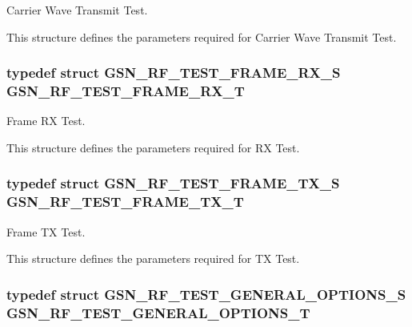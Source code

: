 Carrier Wave Transmit Test. 

This structure defines the parameters required for Carrier Wave Transmit Test. \hypertarget{a00677_gad57c6b5251e62dd07e194a52c90216ac}{
\subsubsection[{GSN\_\-RF\_\-TEST\_\-FRAME\_\-RX\_\-T}]{\setlength{\rightskip}{0pt plus 5cm}typedef struct {\bf GSN\_\-RF\_\-TEST\_\-FRAME\_\-RX\_\-S} {\bf GSN\_\-RF\_\-TEST\_\-FRAME\_\-RX\_\-T}}}
\label{a00677_gad57c6b5251e62dd07e194a52c90216ac}


Frame RX Test. 

This structure defines the parameters required for RX Test. \hypertarget{a00677_ga054447e13e32b5fdf1ba941142c3b8b8}{
\subsubsection[{GSN\_\-RF\_\-TEST\_\-FRAME\_\-TX\_\-T}]{\setlength{\rightskip}{0pt plus 5cm}typedef struct {\bf GSN\_\-RF\_\-TEST\_\-FRAME\_\-TX\_\-S} {\bf GSN\_\-RF\_\-TEST\_\-FRAME\_\-TX\_\-T}}}
\label{a00677_ga054447e13e32b5fdf1ba941142c3b8b8}


Frame TX Test. 

This structure defines the parameters required for TX Test. \hypertarget{a00677_gadc69ae2ca627931231f38c5a07778b9a}{
\subsubsection[{GSN\_\-RF\_\-TEST\_\-GENERAL\_\-OPTIONS\_\-T}]{\setlength{\rightskip}{0pt plus 5cm}typedef struct {\bf GSN\_\-RF\_\-TEST\_\-GENERAL\_\-OPTIONS\_\-S} {\bf GSN\_\-RF\_\-TEST\_\-GENERAL\_\-OPTIONS\_\-T}}}
\label{a00677_gadc69ae2ca627931231f38c5a07778b9a}



